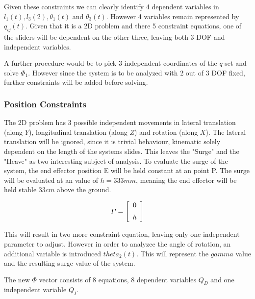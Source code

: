 Given these constraints we can clearly identify 4 dependent variables in $l_1(t),l_3(2),\theta_1(t)$ and $\theta_3(t)$. However 4 variables remain represented by  $q_{ij}(t)$. Given that it is a 2D problem and there 5 constraint equations, one of the sliders will be dependent on the other three, leaving both 3 DOF and independent variables.

A further procedure would be to pick 3 independent coordinates of the $q$-set and solve $\Phi_1$. However since the system is to be analyzed with 2 out of 3 DOF fixed, further constraints will be added before solving.

\subsubsection{Position Constraints}

The 2D problem has 3 possible independent movements in lateral translation (along $Y$), longitudinal translation (along $Z$) and rotation (along $X$). The lateral translation will be ignored, since it is trivial behaviour, kinematic solely dependent on the length of the systems slides. This leaves the "Surge" and the "Heave" as two interesting subject of analysis.
To evaluate the surge of the system, the end effector position E will be held constant at an point P. The surge will be evaluated at an value of $h=333mm$, meaning the end effector will be held stable $33cm$ above the ground.

\begin{align*}
    P =  \left[ \begin {array}{c} 0\\ \noalign{\medskip}h\end {array} \right]
\end{align*}{}

This will result in two more constraint equation, leaving only one independent parameter to adjust. However in order to analyzee the angle of rotation, an additional variable is introduced $theta_2(t)$. This will represent the $gamma$ value and the resulting surge value of the system.

The new $\Phi$ vector consists of 8 equations, 8 dependent variables $Q_D$ and one independent variable $Q_I$.

